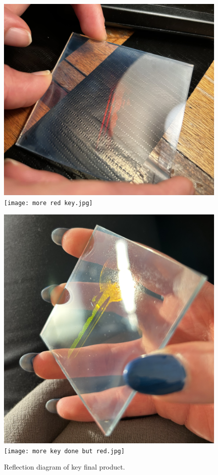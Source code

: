 \documentclass[12pt]{article}
\begin{document}
\begin{figure}[H]
    \centering
    \begin{minipage}{.5\textwidth}
        \includegraphics[width=\linewidth]{holo done 1.jpeg}
        \vfill
        \texttt{[image: more red key.jpg]}
    \end{minipage}
    \hspace{-.5em}
    \begin{minipage}{.452\textwidth}
        \includegraphics[width=\linewidth]{holo done 2 green.jpeg}
        \vfill
        \texttt{[image: more key done but red.jpg]}
    \end{minipage}
    \caption{\centering Reflection diagram of key final product.}
    \label{fig:13}
\end{figure}
\end{document}
